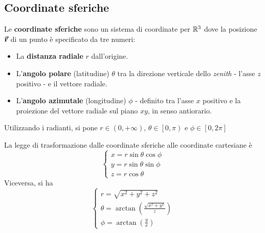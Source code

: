 \subsection{Coordinate sferiche}
\begin{define}
	Le \textbf{coordinate sferiche} sono un sistema di coordinate per $\mathbb{R}^3$ dove la posizione $\vb*{\va{r}}$ di un punto è specificato da tre numeri:
	\begin{itemize}
		\item La \textbf{distanza radiale} $r$ dall'origine.
		\item L'\textbf{angolo polare} (latitudine) $\theta$ tra la direzione verticale dello \textit{zenith} - l'asse $z$ positivo - e il vettore radiale.
		\item L'\textbf{angolo azimutale} (longitudine) $\phi$ - definito tra l'asse $x$ positivo e la proiezione del vettore radiale sul piano $xy$, in senso antiorario.
	\end{itemize}
	Utilizzando i radianti, si pone $r\in\left(0,+\infty\right)$, $\theta\in\left[0,\pi\right)$ e $\phi\in\left[0,2\pi\right]$
\end{define}
La legge di trasformazione dalle coordinate sferiche alle coordinate cartesiane è
\begin{equation}
	\begin{cases}
		x=r\sin\theta\cos\phi\\
		y=r\sin\theta\sin\phi\\
		z=r\cos\theta
	\end{cases}
\end{equation}
Viceversa, si ha
\begin{equation}
	\begin{cases}
		r=\sqrt{x^2+y^2+z^2}\\
		\theta=\arctan\left(\frac{\sqrt{x^2+y^2}}{z}\right)\\
		\phi=\arctan{\left(\frac{y}{x}\right)}
	\end{cases}
\end{equation}
